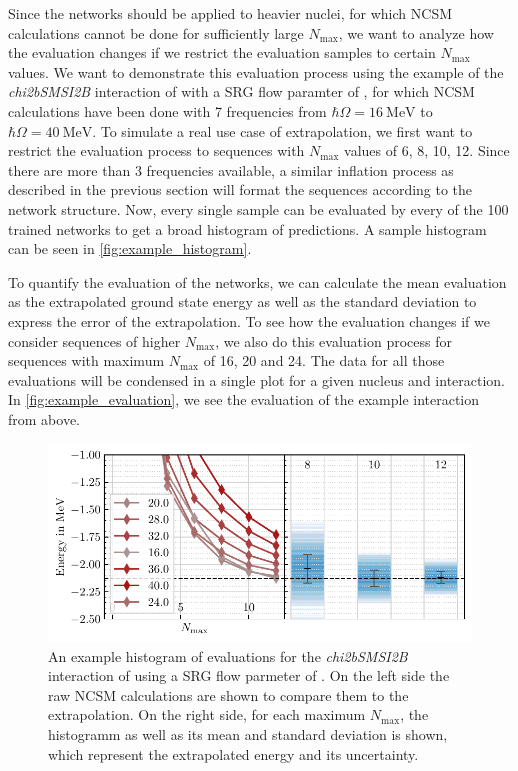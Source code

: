 Since the networks should be applied to heavier nuclei, for which NCSM calculations cannot be done for sufficiently large $N_\mathrm{max}$, we want to analyze how the evaluation changes if we restrict the evaluation samples to certain $N_\mathrm{max}$ values. We want to demonstrate this evaluation process using the example of the \textit{chi2bSMSI2B} interaction of  with a SRG flow paramter of , for which NCSM calculations have been done with 7 frequencies from $\hbar\Omega = \SI{16}{\mega\electronvolt}$ to $\hbar\Omega = \SI{40}{\mega\electronvolt}$. To simulate a real use case of extrapolation, we first want to restrict the evaluation process to sequences with $N_\mathrm{max}$ values of 6, 8, 10, 12. Since there are more than 3 frequencies available, a similar inflation process as described in the previous section will format the sequences according to the network structure. Now, every single sample can be evaluated by every of the 100 trained networks to get a broad histogram of predictions. A sample histogram can be seen in \autoref{fig:example_histogram}.


To quantify the evaluation of the networks, we can calculate the mean evaluation as the extrapolated ground state energy as well as the standard deviation to express the error of the extrapolation. To see how the evaluation changes if we consider sequences of higher $N_\mathrm{max}$, we also do this evaluation process for sequences with maximum $N_\mathrm{max}$ of 16, 20 and 24. The data for all those evaluations will be condensed in a single plot for a given nucleus and interaction. In \autoref{fig:example_evaluation}, we see the evaluation of the example interaction from above.

\begin{figure}[H]
  \centering
  \includegraphics[]{media/example_evaluation.pdf}
  \caption{An example histogram of evaluations for the \textit{chi2bSMSI2B} interaction of  using a SRG flow parmeter of . On the left side the raw NCSM calculations are shown to compare them to the extrapolation. On the right side, for each maximum $N_\mathrm{max}$, the histogramm as well as its mean and standard deviation is shown, which represent the extrapolated energy and its uncertainty.}
  \label{fig:example_evaluation}
\end{figure}
